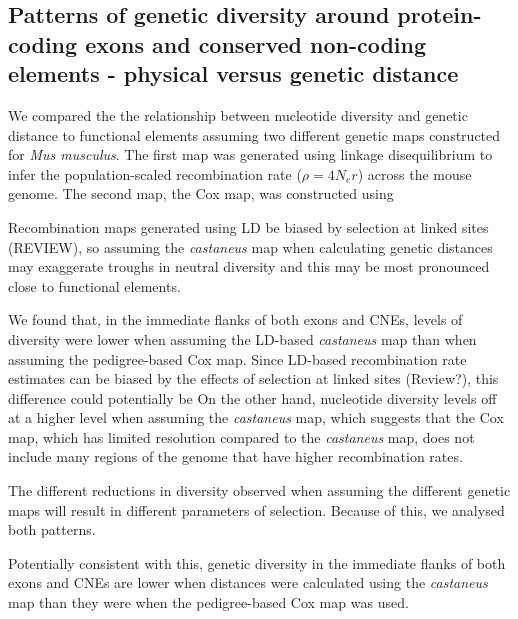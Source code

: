 \documentclass[11pt]{article}
\begin{document}
\subsection*{Patterns of genetic diversity around protein-coding exons and conserved non-coding elements - physical versus genetic distance}

\begin{figure}[h]
   \centering      
   \noindent{}
 \caption[The ]
 
 \label{fig:1}
\end{figure}

	We compared the the relationship between nucleotide diversity and genetic distance to functional elements assuming two different genetic maps constructed for \textit{Mus musculus}. The first map was generated using linkage disequilibrium to infer the population-scaled recombination rate ($\rho = 4N_er$) across the mouse genome. The second map, the Cox map, was constructed using 
	
	Recombination maps generated using LD be biased by selection at linked sites (REVIEW), so assuming the \textit{castaneus} map when calculating genetic distances may exaggerate troughs in neutral diversity and this may be most pronounced close to functional elements.
	
We found that, in the immediate flanks of both exons and CNEs, levels of diversity were lower when assuming the LD-based \textit{castaneus} map than when assuming the pedigree-based Cox map. Since LD-based recombination rate estimates can be biased by the effects of selection at linked sites (Review?), this difference could potentially be 
On the other hand, nucleotide diversity levels off at a higher level when assuming the \textit{castaneus} map, which suggests that the Cox map, which has limited resolution compared to the \textit{castaneus} map, does not include many regions of the genome that have higher recombination rates. 

The different reductions in diversity observed when assuming the different genetic maps will result in different parameters of selection. Because of this, we analysed both patterns.

	Potentially consistent with this, genetic diversity in the immediate flanks of both exons and CNEs are lower when distances were calculated using the \textit{castaneus} map than they were when the pedigree-based Cox map was used.
	
\end{document}
